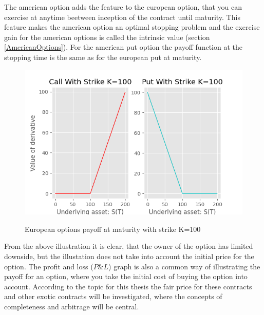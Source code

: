 The american option adds the feature to the european option, that you can exercise at anytime beetween inception of the contract until maturity. This feature makes the american option an optimal stopping problem and the exercise gain for the american options is called the intrinsic value (section \ref{AmericanOptions}). For the american put option the payoff function at the stopping time is the same as for the european put at maturity. 

\begin{figure}[H]
\centering
\includegraphics{Figures/contractfct.png}\\
\decoRule
\caption[Contract Functions]{European options payoff at maturity with strike K=100}
\label{fig:contractfct}
\end{figure}

From the above illustration it is clear, that the owner of the option has limited downside, but the illustation does not take into account the initial price for the option. The profit and loss ($P\& L$) graph is also a common way of illustrating the payoff for an option, where you take the initial cost of buying the option into account. According to the topic for this thesis the fair price for these contracts and other exotic contracts will be investigated, where the concepts of completeness and arbitrage will be central.


